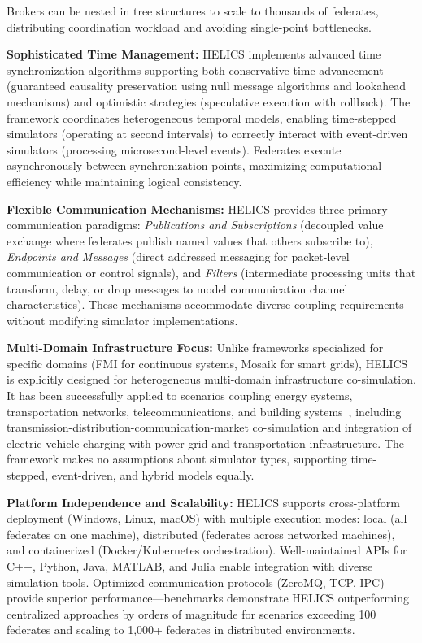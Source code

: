 Brokers can be nested in tree structures to scale to thousands of federates, distributing coordination workload and avoiding single-point bottlenecks.

\textbf{Sophisticated Time Management:} HELICS implements advanced time synchronization algorithms supporting both conservative time advancement (guaranteed causality preservation using null message algorithms and lookahead mechanisms) and optimistic strategies (speculative execution with rollback). The framework coordinates heterogeneous temporal models, enabling time-stepped simulators (operating at second intervals) to correctly interact with event-driven simulators (processing microsecond-level events). Federates execute asynchronously between synchronization points, maximizing computational efficiency while maintaining logical consistency.

\textbf{Flexible Communication Mechanisms:} HELICS provides three primary communication paradigms: \textit{Publications and Subscriptions} (decoupled value exchange where federates publish named values that others subscribe to), \textit{Endpoints and Messages} (direct addressed messaging for packet-level communication or control signals), and \textit{Filters} (intermediate processing units that transform, delay, or drop messages to model communication channel characteristics). These mechanisms accommodate diverse coupling requirements without modifying simulator implementations.

\textbf{Multi-Domain Infrastructure Focus:} Unlike frameworks specialized for specific domains (FMI for continuous systems, Mosaik for smart grids), HELICS is explicitly designed for heterogeneous multi-domain infrastructure co-simulation. It has been successfully applied to scenarios coupling energy systems, transportation networks, telecommunications, and building systems~\cite{helics_transactive,helics_ev_transport}, including transmission-distribution-communication-market co-simulation and integration of electric vehicle charging with power grid and transportation infrastructure. The framework makes no assumptions about simulator types, supporting time-stepped, event-driven, and hybrid models equally.

\textbf{Platform Independence and Scalability:} HELICS supports cross-platform deployment (Windows, Linux, macOS) with multiple execution modes: local (all federates on one machine), distributed (federates across networked machines), and containerized (Docker/Kubernetes orchestration). Well-maintained APIs for C++, Python, Java, MATLAB, and Julia enable integration with diverse simulation tools. Optimized communication protocols (ZeroMQ, TCP, IPC) provide superior performance—benchmarks demonstrate HELICS outperforming centralized approaches by orders of magnitude for scenarios exceeding 100 federates and scaling to 1,000+ federates in distributed environments.

